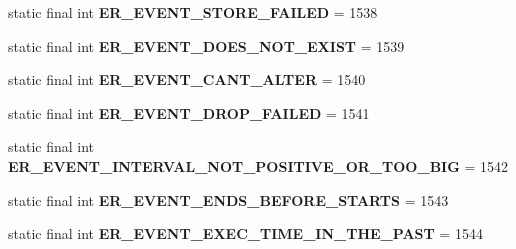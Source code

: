 \begin{DoxyCompactItemize}
\item 
\mbox{\label{classcom_1_1mysql_1_1cj_1_1exceptions_1_1_mysql_error_numbers_ae8c0cd3bdf0c8867ad867f1b98dd9cba}} 
static final int {\bfseries E\+R\+\_\+\+E\+V\+E\+N\+T\+\_\+\+S\+T\+O\+R\+E\+\_\+\+F\+A\+I\+L\+ED} = 1538
\item 
\mbox{\label{classcom_1_1mysql_1_1cj_1_1exceptions_1_1_mysql_error_numbers_ad6d9f3e580a0b9b1eda566586b18818a}} 
static final int {\bfseries E\+R\+\_\+\+E\+V\+E\+N\+T\+\_\+\+D\+O\+E\+S\+\_\+\+N\+O\+T\+\_\+\+E\+X\+I\+ST} = 1539
\item 
\mbox{\label{classcom_1_1mysql_1_1cj_1_1exceptions_1_1_mysql_error_numbers_a58460eee2c46b7a297dca1c678e41062}} 
static final int {\bfseries E\+R\+\_\+\+E\+V\+E\+N\+T\+\_\+\+C\+A\+N\+T\+\_\+\+A\+L\+T\+ER} = 1540
\item 
\mbox{\label{classcom_1_1mysql_1_1cj_1_1exceptions_1_1_mysql_error_numbers_aeaf3174fe0a79b0ce7ae9470a8cf549c}} 
static final int {\bfseries E\+R\+\_\+\+E\+V\+E\+N\+T\+\_\+\+D\+R\+O\+P\+\_\+\+F\+A\+I\+L\+ED} = 1541
\item 
\mbox{\label{classcom_1_1mysql_1_1cj_1_1exceptions_1_1_mysql_error_numbers_a133a7f4cf108e8bb7b0b0ce22c8bfed4}} 
static final int {\bfseries E\+R\+\_\+\+E\+V\+E\+N\+T\+\_\+\+I\+N\+T\+E\+R\+V\+A\+L\+\_\+\+N\+O\+T\+\_\+\+P\+O\+S\+I\+T\+I\+V\+E\+\_\+\+O\+R\+\_\+\+T\+O\+O\+\_\+\+B\+IG} = 1542
\item 
\mbox{\label{classcom_1_1mysql_1_1cj_1_1exceptions_1_1_mysql_error_numbers_aeff0919e3ccfb366c20b93f5f1394476}} 
static final int {\bfseries E\+R\+\_\+\+E\+V\+E\+N\+T\+\_\+\+E\+N\+D\+S\+\_\+\+B\+E\+F\+O\+R\+E\+\_\+\+S\+T\+A\+R\+TS} = 1543
\item 
\mbox{\label{classcom_1_1mysql_1_1cj_1_1exceptions_1_1_mysql_error_numbers_a10d0d0f519726116c762000efd368994}} 
static final int {\bfseries E\+R\+\_\+\+E\+V\+E\+N\+T\+\_\+\+E\+X\+E\+C\+\_\+\+T\+I\+M\+E\+\_\+\+I\+N\+\_\+\+T\+H\+E\+\_\+\+P\+A\+ST} = 1544

\end{DoxyCompactItemize}
